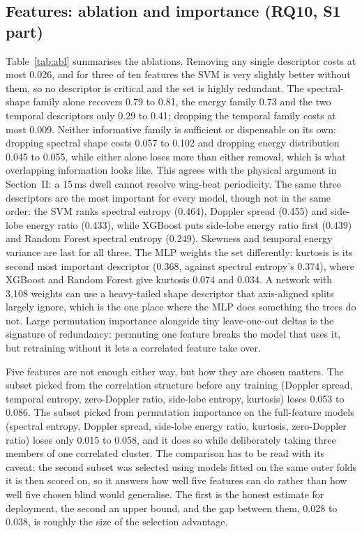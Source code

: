 \documentclass[conference]{IEEEtran}
\begin{document}
\subsection{Features: ablation and importance (RQ10, S1 part)}
Table~\ref{tab:abl} summarises the ablations. Removing any single descriptor costs at most 0.026, and for three of ten features the SVM is very slightly better without them, so no descriptor is critical and the set is highly redundant. The spectral-shape family alone recovers 0.79 to 0.81, the energy family 0.73 and the two temporal descriptors only 0.29 to 0.41; dropping the temporal family costs at most 0.009. Neither informative family is sufficient or dispensable on its own: dropping spectral shape costs 0.057 to 0.102 and dropping energy distribution 0.045 to 0.055, while either alone loses more than either removal, which is what overlapping information looks like. This agrees with the physical argument in Section~II: a 15\,ms dwell cannot resolve wing-beat periodicity. The same three descriptors are the most important for every model, though not in the same order: the SVM ranks spectral entropy (0.464), Doppler spread (0.455) and side-lobe energy ratio (0.433), while XGBoost puts side-lobe energy ratio first (0.439) and Random Forest spectral entropy (0.249). Skewness and temporal energy variance are last for all three. The MLP weights the set differently: kurtosis is its second most important descriptor (0.368, against spectral entropy's 0.374), where XGBoost and Random Forest give kurtosis 0.074 and 0.034. A network with 3,108 weights can use a heavy-tailed shape descriptor that axis-aligned splits largely ignore, which is the one place where the MLP does something the trees do not. Large permutation importance alongside tiny leave-one-out deltas is the signature of redundancy: permuting one feature breaks the model that uses it, but retraining without it lets a correlated feature take over.

Five features are not enough either way, but how they are chosen matters. The subset picked from the correlation structure before any training (Doppler spread, temporal entropy, zero-Doppler ratio, side-lobe entropy, kurtosis) loses 0.053 to 0.086. The subset picked from permutation importance on the full-feature models (spectral entropy, Doppler spread, side-lobe energy ratio, kurtosis, zero-Doppler ratio) loses only 0.015 to 0.058, and it does so while deliberately taking three members of one correlated cluster. The comparison has to be read with its caveat: the second subset was selected using models fitted on the same outer folds it is then scored on, so it answers how well five features can do rather than how well five chosen blind would generalise. The first is the honest estimate for deployment, the second an upper bound, and the gap between them, 0.028 to 0.038, is roughly the size of the selection advantage.
\end{document}
